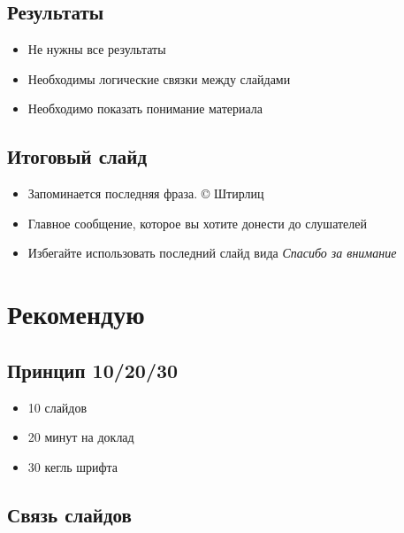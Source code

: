 \documentclass[
  letterpaper,
  DIV=11,
  numbers=noendperiod]{scrartcl}
\providecommand{\tightlist}{%
  \setlength{\itemsep}{0pt}\setlength{\parskip}{0pt}}\usepackage{longtable,booktabs,array}
\begin{document}
\subsection{Результаты}\label{ux440ux435ux437ux443ux43bux44cux442ux430ux442ux44b-1}

\begin{itemize}
\tightlist
\item
  Не нужны все результаты
\item
  Необходимы логические связки между слайдами
\item
  Необходимо показать понимание материала
\end{itemize}

\subsection{Итоговый
слайд}\label{ux438ux442ux43eux433ux43eux432ux44bux439-ux441ux43bux430ux439ux434}

\begin{itemize}
\tightlist
\item
  Запоминается последняя фраза. © Штирлиц
\item
  Главное сообщение, которое вы хотите донести до слушателей
\item
  Избегайте использовать последний слайд вида \emph{Спасибо за внимание}
\end{itemize}

\section{Рекомендую}\label{ux440ux435ux43aux43eux43cux435ux43dux434ux443ux44e}

\subsection{Принцип
10/20/30}\label{ux43fux440ux438ux43dux446ux438ux43f-102030}

\begin{itemize}
\tightlist
\item
  10 слайдов
\item
  20 минут на доклад
\item
  30 кегль шрифта
\end{itemize}

\subsection{Связь
слайдов}\label{ux441ux432ux44fux437ux44c-ux441ux43bux430ux439ux434ux43eux432}
\end{document}
